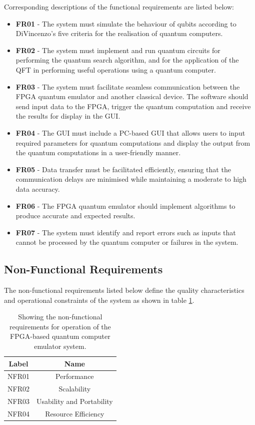 Corresponding descriptions of the functional requirements are listed below:
\begin{itemize}
	\item
	\textbf{FR01} - The system must simulate the behaviour of qubits according to DiVincenzo's five criteria for the realisation of quantum computers.
	\item
	\textbf{FR02} - The system must implement and run quantum circuits for performing the quantum search algorithm, and for the application of the QFT in performing useful operations using a quantum computer. 
	\item 
	\textbf{FR03} - The system must facilitate seamless communication between the FPGA quantum emulator and another classical device. The software should send input data to the FPGA, trigger the quantum computation and receive the results for display in the GUI.
	\item 
	\textbf{FR04} - The GUI must include a PC-based GUI that allows users to input required parameters for quantum computations and display the output from the quantum computations in a user-friendly manner.
	\item 
	\textbf{FR05} - Data transfer must be facilitated efficiently, ensuring that the communication delays are minimised while maintaining a moderate to high data accuracy. 
	\item 
	\textbf{FR06} - The FPGA quantum emulator should implement algorithms to produce accurate and expected results.
	\item 
	\textbf{FR07} - The system must identify and report errors such as inputs that cannot be processed by the quantum computer or failures in the system.
\end{itemize}

\subsection{Non-Functional Requirements \label{subsec:method-non-funct-req}}

The non-functional requirements listed below define the quality characteristics and operational constraints of the system as shown in table \ref{tab:nfrs}.
\begin{table}[ht!]
	\centering
	\caption[Non-Functional System Requirements.]{Showing the non-functional requirements for operation of the FPGA-based quantum computer emulator system.}
	\label{tab:nfrs}
	\begin{tabular}{ | c| c | } 
		\hline
		\textbf{Label} & \textbf{Name} \\ 
		\hline
		NFR01 & Performance \\ 
		\hline
		NFR02 & Scalability  \\ 
		\hline
		NFR03 & Usability and Portability\\ 
		\hline
		NFR04 & Resource Efficiency\\ 
		\hline
	\end{tabular}
\end{table}


